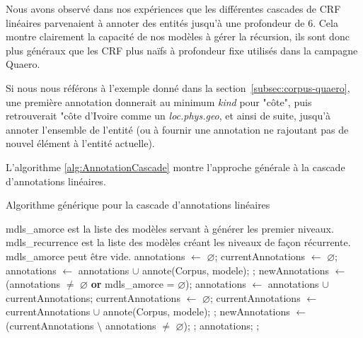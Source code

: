 \documentclass[PhD-Yoann-Dupont.tex]{subfiles}
\begin{document}
Nous avons observé dans nos expériences que les différentes cascades de CRF linéaires parvenaient à annoter des entités jusqu'à une profondeur de 6. Cela montre clairement la capacité de nos modèles à gérer la récursion, ils sont donc plus généraux que les CRF plus naïfs à profondeur fixe utilisés dans la campagne Quaero.

Si nous nous référons à l'exemple donné dans la section\ \ref{subsec:corpus-quaero}, une première annotation donnerait au minimum \emph{kind} pour "côte", puis retrouverait "côte d'Ivoire comme un \emph{loc.phys.geo}, et ainsi de suite, jusqu'à annoter l'ensemble de l'entité (ou à fournir une annotation ne rajoutant pas de nouvel élément à l'entité actuelle).

L'algorithme \ref{alg:AnnotationCascade} montre l'approche générale à la cascade d'annotations linéaires.

\begin{algorithm}[ht!]
\caption{Algorithme générique pour la cascade d'annotations linéaires}
\label{alg:AnnotationCascade}
\begin{algorithmic}
    \State \Comment mdls\_amorce est la liste des modèles servant à générer les premier niveaux.
    \State \Comment mdls\_recurrence est la liste des modèles créant les niveaux de façon récurrente.
    \State \Comment mdls\_amorce peut être vide.
    \State annotations $\gets$ $\varnothing$;
    \State currentAnnotations $\gets$ $\varnothing$;
        \State annotations $\gets$ annotations $\cup$ annote(Corpus, modele);
    \EndFor;
    \State newAnnotations $\gets$ (annotations $\neq$ $\varnothing$ \textbf{or} mdls\_amorce = $\varnothing$);
        \State annotations $\gets$ annotations $\cup$ currentAnnotations;
        \State currentAnnotations $\gets$ $\varnothing$;
            \State currentAnnotations $\gets$ currentAnnotations $\cup$ annote(Corpus, modele);
        \EndFor;
        \State newAnnotations $\gets$ (currentAnnotations $\setminus$ annotations $\neq$ $\varnothing$);
    \EndWhile;
    \State \Return annotations;
    \EndFunction;
\end{algorithmic}
\end{algorithm}
\end{document}
